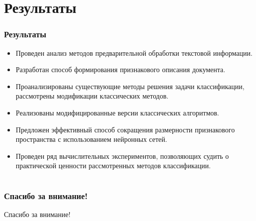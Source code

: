 \documentclass{beamer}
\begin{document}
\section{Результаты}
\begin{frame}
\end{frame}

\begin{frame}
\frametitle{Результаты}
\begin{itemize}
	\item{Проведен анализ методов предварительной обработки текстовой информации.}
	\item{Разработан способ формирования признакового описания документа.}
	\item{Проанализированы существующие методы решения задачи классификации, рассмотрены модификации классических методов.}
	\item{Реализованы модифицированные версии классических алгоритмов.}
	\item{Предложен эффективный способ сокращения размерности признакового пространства с использованием нейронных сетей.}
	\item{Проведен ряд вычислительных экспериментов, позволяющих судить о практической ценности рассмотренных методов классификации.}
\end{itemize}
\end{frame}



\section{}
\begin{frame}
\frametitle{Спасибо за внимание!}
	\begin{center}
		Спасибо за внимание!
	\end{center}
\end{frame}
\end{document}
